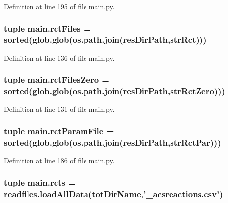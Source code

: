 Definition at line 195 of file main.\-py.

\hypertarget{a00122_a9016a8f5eafe76e4e8dbb1bc3ce94af5}{
\subsubsection[{rct\-Files}]{\setlength{\rightskip}{0pt plus 5cm}tuple main.\-rct\-Files = sorted(glob.\-glob(os.\-path.\-join({\bf res\-Dir\-Path},{\bf str\-Rct})))}}\label{a00122_a9016a8f5eafe76e4e8dbb1bc3ce94af5}


Definition at line 136 of file main.\-py.

\hypertarget{a00122_aa37eddd86a00bf98dff8cc9260d6d13b}{
\subsubsection[{rct\-Files\-Zero}]{\setlength{\rightskip}{0pt plus 5cm}tuple main.\-rct\-Files\-Zero = sorted(glob.\-glob(os.\-path.\-join({\bf res\-Dir\-Path},{\bf str\-Rct\-Zero})))}}\label{a00122_aa37eddd86a00bf98dff8cc9260d6d13b}


Definition at line 131 of file main.\-py.

\hypertarget{a00122_ac4e9cba2fd0b813ba19029541ad609e5}{
\subsubsection[{rct\-Param\-File}]{\setlength{\rightskip}{0pt plus 5cm}tuple main.\-rct\-Param\-File = sorted(glob.\-glob(os.\-path.\-join({\bf res\-Dir\-Path},{\bf str\-Rct\-Par})))}}\label{a00122_ac4e9cba2fd0b813ba19029541ad609e5}


Definition at line 186 of file main.\-py.

\hypertarget{a00122_ac2fe1ed3228b8e616f25ccfbe4cc7dc4}{
\subsubsection[{rcts}]{\setlength{\rightskip}{0pt plus 5cm}tuple main.\-rcts = readfiles.\-load\-All\-Data({\bf tot\-Dir\-Name},'\-\_\-acsreactions.\-csv')}}\label{a00122_ac2fe1ed3228b8e616f25ccfbe4cc7dc4}


